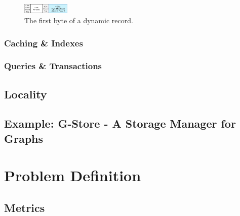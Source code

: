                 \begin{figure}[htp]\label{dynamic_first}
                    \begin{center}
                        \includegraphics[keepaspectratio,height=0.2\textheight,width=0.2\textwidth]{img/03_record/dynamic_first_byte.png}
                    \end{center}
                    \caption{The first byte of a dynamic record.} %
                \end{figure}
        
        \subsubsection{Caching \& Indexes}
        
        \subsubsection{Queries \& Transactions}
            
            
         
    \subsection{Locality}\label{\positionnumber}
    
    \subsection{Example: G-Store - A Storage Manager for Graphs}
    
    
    
\section{Problem Definition}\label{\positionnumber}

    \subsection{Metrics}

